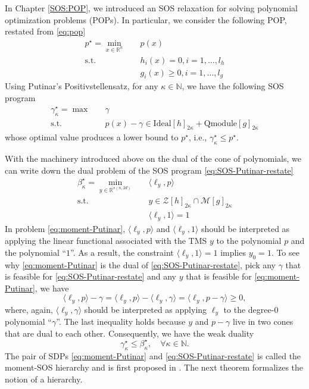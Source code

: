 \documentclass[
]{book}
\theoremstyle{definition}
\theoremstyle{definition}
\theoremstyle{definition}
\theoremstyle{definition}
\theoremstyle{remark}
\begin{document}
In Chapter \ref{SOS:POP}, we introduced an SOS relaxation for solving polynomial optimization problems (POPs). In particular, we consider the following POP, restated from \eqref{eq:pop}
\begin{equation}
\begin{split}
p^\star = \min_{x \in \mathbb{R}^{n}} & \quad p(x) \\
\mathrm{s.t.}& \quad h_i(x) = 0, i=1,\dots,l_h \\
& \quad g_i(x) \geq 0, i=1,\dots,l_g
\end{split}
\label{eq:pop-restate}
\end{equation}
Using Putinar's Positivstellensatz, for any \(\kappa \in \mathbb{N}\), we have the following SOS program
\begin{equation}
\boxed{
\begin{split}
\gamma_{\kappa}^\star = \max & \quad \gamma \\
 \mathrm{s.t.}& \quad p(x) - \gamma \in \mathrm{Ideal}[h]_{2\kappa} + \mathrm{Qmodule}[g]_{2\kappa}
\end{split}
}
\label{eq:SOS-Putinar-restate}
\end{equation}
whose optimal value produces a lower bound to \(p^\star\), i.e., \(\gamma_{\kappa}^\star \leq p^\star\).

With the machinery introduced above on the dual of the cone of polynomials, we can write down the dual problem of the SOS program \eqref{eq:SOS-Putinar-restate}
\begin{equation}
\boxed{
\begin{split}
\beta_{\kappa}^\star = \min_{y \in \mathbb{R}^{s(n,2d)}} & \quad \langle \ell_y, p \rangle \\
\mathrm{s.t.}& \quad y \in \mathcal{Z}[h]_{2\kappa} \cap \mathcal{M}[g]_{2\kappa} \\
& \quad \langle \ell_y, 1 \rangle = 1
\end{split}
}
\label{eq:moment-Putinar}
\end{equation}
In problem \eqref{eq:moment-Putinar}, \(\langle \ell_y, p \rangle\) and \(\langle \ell_y, 1 \rangle\) should be interpreted as applying the linear functional associated with the TMS \(y\) to the polynomial \(p\) and the polynomial ``\(1\)''. As a result, the constraint \(\langle \ell_y, 1 \rangle=1\) implies \(y_0 = 1\). To see why \eqref{eq:moment-Putinar} is the dual of \eqref{eq:SOS-Putinar-restate}, pick any \(\gamma\) that is feasible for \eqref{eq:SOS-Putinar-restate} and any \(y\) that is feasible for \eqref{eq:moment-Putinar}, we have
\[
\langle \ell_y, p \rangle - \gamma = \langle \ell_y, p \rangle - \langle \ell_y, \gamma \rangle = \langle \ell_y, p - \gamma \rangle \geq 0,
\]
where, again, \(\langle \ell_y, \gamma \rangle\) should be interpreted as applying \(\ell_y\) to the degree-\(0\) polynomial ``\(\gamma\)''. The last inequality holds because \(y\) and \(p - \gamma\) live in two cones that are dual to each other. Consequently, we have the weak duality
\[
\gamma_{\kappa}^\star \leq \beta_{\kappa}^\star, \quad \forall \kappa \in \mathbb{N}.
\]
The pair of SDPs \eqref{eq:moment-Putinar} and \eqref{eq:SOS-Putinar-restate} is called the moment-SOS hierarchy and is first proposed in \citep{lasserre01siopt-global}. The next theorem formalizes the notion of a hierarchy.
\end{document}
